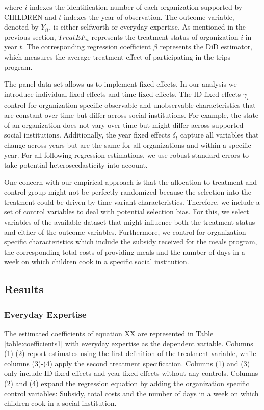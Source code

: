 \documentclass[12pt, a4paper, titlepage]{article}\usepackage[]{graphicx}\usepackage[]{color}
\begin{document}
where $i$ indexes the identification number of each organization supported by CHILDREN and $t$ indexes the year of observation. The outcome variable, denoted by $Y_{it}$, is either selfworth or everyday expertise. As mentioned in the previous section, $TreatEF_{it}$ represents the treatment status of organization $i$ in year $t$. The corresponding regression coefficient $\beta$ represents the DiD estimator, which measures the average treatment effect of participating in the trips program.

The panel data set allows us to implement fixed effects. In our analysis we introduce individual fixed effects and time fixed effects. The ID fixed effects $\gamma_{i}$ control for organization specific observable and unobservable characteristics that are constant over time but differ across social institutions. For example, the state of an organization does not vary over time but might differ across supported social institutions. Additionally, the year fixed effects $\delta_{t}$ capture all variables that change across years but are the same for all organizations and within a specific year. For all following regression estimations, we use robust standard errors to take potential heteroscedasticity into account.

One concern with our empirical approach is that the allocation to treatment and control group might not be perfectly randomized because the selection into the treatment could be driven by time-variant characteristics. Therefore, we include a set of control variables to deal with potential selection bias. For this, we select variables of the available dataset that might influence both the treatment status and either of the outcome variables. Furthermore, we control for organization specific characteristics which include the subsidy received for the meals program, the corresponding total costs of providing meals and the number of days in a week on which children cook in a specific social institution.

\subsection{Results}

\subsubsection{Everyday Expertise}

The estimated coefficients of equation XX are represented in Table \ref{table:coefficients1} with everyday expertise as the dependent variable. Columns (1)-(2) report estimates using the first definition of the treatment variable, while columns (3)-(4) apply the second treatment specification. Columns (1) and (3) only include ID fixed effects and year fixed effects without any controls. Columns (2) and (4) expand the regression equation by adding the organization specific control variables: Subsidy, total costs and the number of days in a week on which children cook in a social institution.
\end{document}
